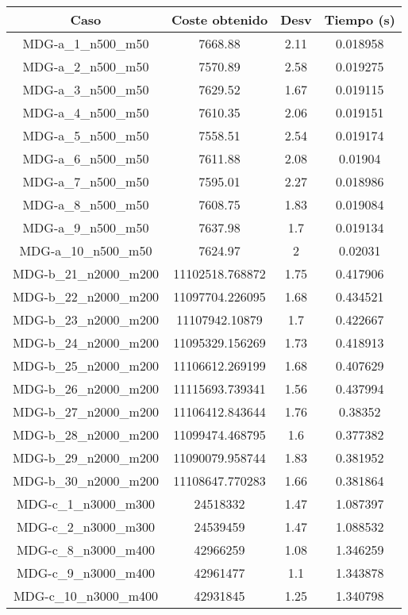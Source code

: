 \documentclass{article}
\begin{document}
\begin{table}[H]
	\centering
	\begin{tabular}{|cccc|}
		\hline
		Caso & Coste obtenido & Desv & Tiempo (s)\\ \hline
		MDG-a\_1\_n500\_m50 & 7668.88 & 2.11 & 0.018958\\
		MDG-a\_2\_n500\_m50 & 7570.89 & 2.58 & 0.019275\\
		MDG-a\_3\_n500\_m50 & 7629.52 & 1.67 & 0.019115\\
		MDG-a\_4\_n500\_m50 & 7610.35 & 2.06 & 0.019151\\
		MDG-a\_5\_n500\_m50 & 7558.51 & 2.54 & 0.019174\\
		MDG-a\_6\_n500\_m50 & 7611.88 & 2.08 & 0.01904\\
		MDG-a\_7\_n500\_m50 & 7595.01 & 2.27 & 0.018986\\
		MDG-a\_8\_n500\_m50 & 7608.75 & 1.83 & 0.019084\\
		MDG-a\_9\_n500\_m50 & 7637.98 & 1.7 & 0.019134\\
		MDG-a\_10\_n500\_m50 & 7624.97 & 2 & 0.02031\\
		MDG-b\_21\_n2000\_m200 & 11102518.768872 & 1.75 & 0.417906\\
		MDG-b\_22\_n2000\_m200 & 11097704.226095 & 1.68 & 0.434521\\
		MDG-b\_23\_n2000\_m200 & 11107942.10879 & 1.7 & 0.422667\\
		MDG-b\_24\_n2000\_m200 & 11095329.156269 & 1.73 & 0.418913\\
		MDG-b\_25\_n2000\_m200 & 11106612.269199 & 1.68 & 0.407629\\
		MDG-b\_26\_n2000\_m200 & 11115693.739341 & 1.56 & 0.437994\\
		MDG-b\_27\_n2000\_m200 & 11106412.843644 & 1.76 & 0.38352\\
		MDG-b\_28\_n2000\_m200 & 11099474.468795 & 1.6 & 0.377382\\
		MDG-b\_29\_n2000\_m200 & 11090079.958744 & 1.83 & 0.381952\\
		MDG-b\_30\_n2000\_m200 & 11108647.770283 & 1.66 & 0.381864\\
		MDG-c\_1\_n3000\_m300 & 24518332 & 1.47 & 1.087397\\
		MDG-c\_2\_n3000\_m300 & 24539459 & 1.47 & 1.088532\\
		MDG-c\_8\_n3000\_m400 & 42966259 & 1.08 & 1.346259\\
		MDG-c\_9\_n3000\_m400 & 42961477 & 1.1 & 1.343878\\
		MDG-c\_10\_n3000\_m400 & 42931845 & 1.25 & 1.340798\\

\end{tabular}
\end{table}
\end{document}
